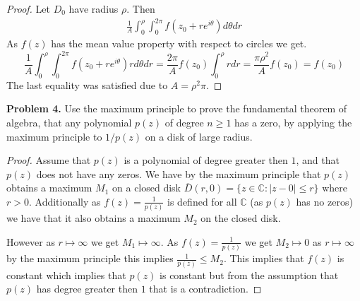 \documentclass[letter,12pt,reqno]{article}
\begin{document}
\begin{proof}
    Let $D_0$ have radius $\rho$. Then 
    \begin{align*}
    \frac{1}{A}\int_0^\rho\int_0^{2\pi}f(z_0+re^{i\theta})d\theta dr
    \end{align*}
    As $f(z)$ has the mean value property with respect to circles we get.
    \[
        \frac{1}{A}\int_0^\rho\int_0^{2\pi}f(z_0+re^{i\theta})rd\theta dr
        =\frac{2\pi}{A}f(z_0) \int_0^\rho r dr=\frac{\pi\rho^2}{A}f(z_0) =f(z_0)
    \]
    The last equality was satisfied due to $A=\rho^2 \pi$.
\end{proof}

\begin{tcolorbox}
    \textbf{Problem 4.}
    Use the maximum principle to prove the fundamental theorem of algebra, that any polynomial $p(z)$ of degree $n \geq 1$ has a zero, by applying the maximum principle to $1/p(z)$ on a disk of large radius.  
\end{tcolorbox}

\begin{proof}
    Assume that $p(z)$ is a polynomial of degree greater then $1$, and that $p(z)$ does not have any zeros. We have by the maximum principle that $p(z)$ obtains a maximum $M_1$ on a closed disk $\overline D(r,0)=\{z\in \mathbb{C}: |z-0|\leq r\}$ where $r>0$. Additionally as $f(z)=\frac{1}{p(z)}$ is defined for all $\mathbb{C}$ (as $p(z)$ has no zeros) we have that it also obtains a maximum $M_2$ on the closed disk. 

    However as $r\mapsto \infty$ we get $M_1\mapsto \infty$. As $f(z)=\frac{1}{p(z)}$ we get $M_2 \mapsto 0$ as $r\mapsto \infty$ by the maximum principle this implies $\frac{1}{p(z)}\leq M_2$. This implies that $f(z)$ is constant which implies that $p(z)$ is constant but from the assumption that $p(z)$ has degree greater then $1$ that is a contradiction. 
\end{proof}
\end{document}
